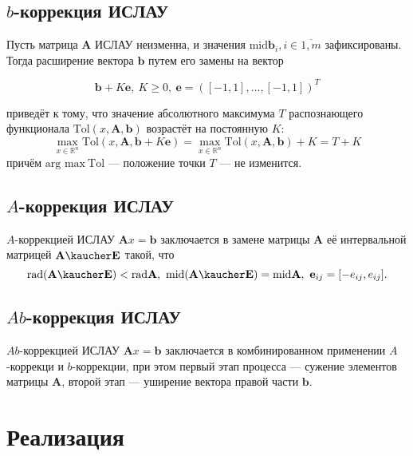 \documentclass[a4paper,14pt]{article}
\begin{document}
  \subsection{\( b \)-коррекция ИСЛАУ}

  Пусть матрица \( \mathbf{A} \) ИСЛАУ неизменна, и значения
  \( \text{mid} \mathbf{b}_i, i \in \overline{1,m} \) зафиксированы. Тогда
  расширение вектора \( \mathbf{b} \) путем его замены на вектор

  \begin{equation} \label{eq:b-correction}
    \mathbf{b} + K\mathbf{e}, \ K \ge 0, \ \mathbf{e} = ([-1, 1], \dots, [-1, 1])^T
  \end{equation}

  приведёт к тому, что значение абсолютного максимума \( T \) распознающего функционала \( \text{Tol} (x, \mathbf{A}, \mathbf{b}) \) возрастёт на
  постоянную \( K \):
  \[
    \max_{x \in \mathbb{R}^n} \text{Tol} (x, \mathbf{A}, \mathbf{b} + K \mathbf{e})
      = \max_{x \in \mathbb{R}^n} \text{Tol} (x, \mathbf{A}, \mathbf{b}) + K = T + K
  \]
  причём \( \text{arg max} \ \text{Tol} \) — положение точки \( T \) ---
  не изменится.

  \subsection{\( A \)-коррекция ИСЛАУ}

  \( A \)-коррекцией ИСЛАУ \( \mathbf{A}x = \mathbf{b} \) заключается
  в замене матрицы \( \mathbf{A} \) её интервальной матрицей
  \( \mathbf{A} \kaucher \mathbf{E} \) такой, что
  \[
    \text{rad} (\mathbf{A} \kaucher \mathbf{E}) < \text{rad} \mathbf{A}, \
    \text{mid} (\mathbf{A} \kaucher \mathbf{E}) = \text{mid} \mathbf{A}, \
    \mathbf{e}_{ij} = [-e_{ij}, e_{ij}].
  \]

\subsection{\( Ab \)-коррекция ИСЛАУ}

  \( Ab \)-коррекцией ИСЛАУ \( \mathbf{A}x = \mathbf{b} \) заключается
  в комбинированном применении \( A \)-коррекци и \( b \)-коррекции,
  при этом первый этап процесса --- сужение элементов матрицы
  \( \mathbf{A} \), второй этап --- уширение вектора правой части
  \( \mathbf{b} \).

  \section{Реализация}
\end{document}
